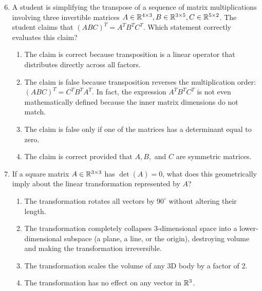 \begin{enumerate}
    \setcounter{enumi}{5}
    \item A student is simplifying the transpose of a sequence of matrix multiplications involving three invertible matrices $A \in \mathbb{R}^{4 \times 3}, B \in \mathbb{R}^{3 \times 5}, C \in \mathbb{R}^{5 \times 2}$. The student claims that $(ABC)^T = A^T B^T C^T$. Which statement correctly evaluates this claim?
    \begin{enumerate}
        \item The claim is correct because transposition is a linear operator that distributes directly across all factors.
        \item The claim is false because transposition reverses the multiplication order: $(ABC)^T = C^T B^T A^T$. In fact, the expression $A^T B^T C^T$ is not even mathematically defined because the inner matrix dimensions do not match.
        \item The claim is false only if one of the matrices has a determinant equal to zero.
        \item The claim is correct provided that $A, B,$ and $C$ are symmetric matrices.
    \end{enumerate}

    \item If a square matrix $A \in \mathbb{R}^{3 \times 3}$ has $\det(A) = 0$, what does this geometrically imply about the linear transformation represented by $A$?
    \begin{enumerate}
        \item The transformation rotates all vectors by $90^\circ$ without altering their length.
        \item The transformation completely collapses 3-dimensional space into a lower-dimensional subspace (a plane, a line, or the origin), destroying volume and making the transformation irreversible.
        \item The transformation scales the volume of any 3D body by a factor of 2.
        \item The transformation has no effect on any vector in $\mathbb{R}^3$.
    \end{enumerate}
\end{enumerate}
